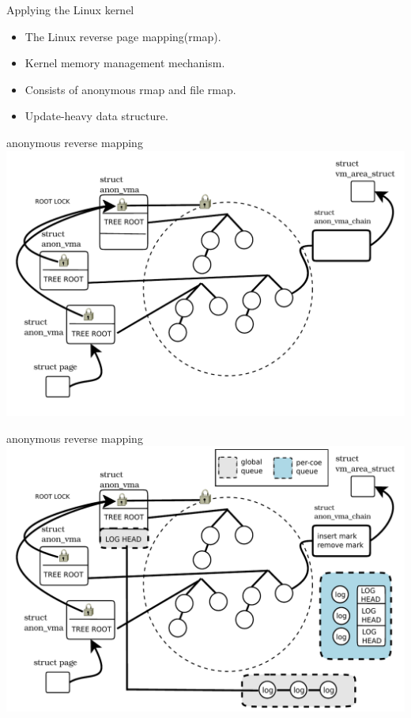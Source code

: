 \documentclass[english]{beamer} %
\begin{document}
\begin{frame}{Applying the Linux kernel}
    \begin{itemize}[<+-| alert@+>]
    \item The Linux reverse page mapping(rmap).
    \item Kernel memory management mechanism.
    \item Consists of anonymous rmap and file rmap.
    \item Update-heavy data structure.
    \end{itemize}
\end{frame}

\begin{frame}{anonymous reverse mapping}
\includegraphics[scale=0.5]{fig/anon_vma_default}
\end{frame}


\begin{frame}{anonymous reverse mapping}
\includegraphics[scale=0.5]{fig/anon_vma}
\end{frame}
\end{document}
